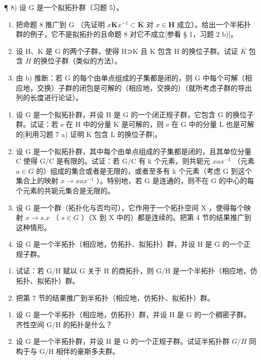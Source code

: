¶ 8) 设 G 是一个拟拓扑群（习题 5）。

\begin{enumerate}
\def\labelenumi{\alph{enumi})}
\item
  把命题 8 推广到 G （先证明 \(x\overline{\mathbf{K}}x^{-1} \subset \overline{\mathbf{K}}\) 对 \(x \in \mathbf{H}\) 成立）。给出一个半拓扑群的例子，它不是拟拓扑的且命题 8 对它不成立{[}参看 § 1，习题 2 b){]}。
\item
  设 H、K 是 G 的两个子群，使得 H⊃K 且 K 包含 H 的换位子群。试证 \(\overline{K}\) 包含 \(\overline{H}\) 的换位子群（类似的方法）。
\item
  由 b) 推断：若 G 的每个由单点组成的子集都是闭的，则 G 中每个可解（相应地，交换）子群的闭包是可解的（相应地，交换的）（就所考虑子群的导出列的长度进行论证）。
\end{enumerate}

\begin{enumerate}
\def\labelenumi{\arabic{enumi})}
\setcounter{enumi}{8}
\item
  设 G 是一个拟拓扑群，并设 H 是 G 的一个闭正规子群，它包含 G 的换位子群。试证：若 e 在 H 中的分量 K 是可解的，则 e 在 G 中的分量 L 也是可解的{[}利用习题 7 a) 证明 K 包含 L 的换位子群{]}。
\item
  设 G 是一个拟拓扑群，其中每个由单点组成的子集都是闭的，且其单位分量 C 使得 G/C 是有限的。试证：若 G/C 有 k 个元素，则共轭元 \(xax^{-1}\) （元素 \(a \in G\) 的）组成的集合或者是无限的，或者至多有 k 个元素（考虑 G 到这个集合上的映射 \(x \rightarrow xax^{-1}\) ）。特别地，若 G 是连通的，则不在 G 的中心的每个元素的共轭元集合是无限的。
\item
  设 G 是一个群（拓扑化与否均可），它作用于一个拓扑空间 X ，使得每个映射 \(x \rightarrow s.x\) （ \(s \in G\) ）（X 到 X 中的）都是连续的。把第 4 节的结果推广到这种情形。
\item
  设 G 是一个半拓扑（相应地，仿拓扑、拟拓扑）群，并设 H 是 G 的一个正规子群。
\end{enumerate}

\begin{enumerate}
\def\labelenumi{\alph{enumi})}
\item
  试证：若 G/H 赋以 G 关于 H 的商拓扑，则 G/H 是一个半拓扑（相应地，仿拓扑、拟拓扑）群。
\item
  把第 7 节的结果推广到半拓扑（相应地，仿拓扑、拟拓扑）群。
\end{enumerate}

\begin{enumerate}
\def\labelenumi{\arabic{enumi})}
\setcounter{enumi}{12}
\item
  设 G 是一个半拓扑（相应地，仿拓扑）群，并设 H 是 G 的一个稠密子群。齐性空间 G/H 的拓扑是什么？
\item
  设 G 是一个半拓扑群，并设 H 是 G 的一个正规子群。试证半拓扑群 \(G/\overline{H}\) 同构于与 G/H 相伴的豪斯多夫群。
\end{enumerate}

